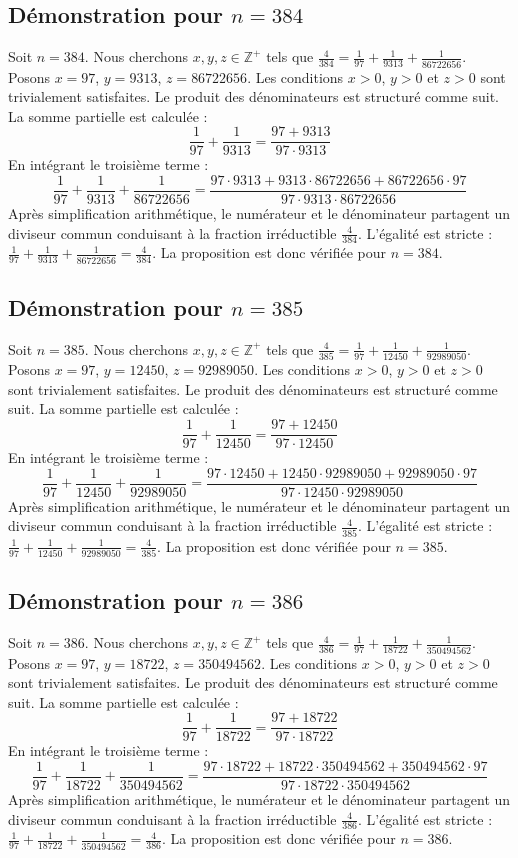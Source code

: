 \documentclass[11pt,a4paper]{article}
\begin{document}
\subsection{Démonstration pour $n = 384$}
Soit $n = 384$. Nous cherchons $x, y, z \in \mathbb{Z}^{+}$ tels que $\frac{4}{384} = \frac{1}{97} + \frac{1}{9313} + \frac{1}{86722656}$.
Posons $x = 97$, $y = 9313$, $z = 86722656$.
Les conditions $x > 0$, $y > 0$ et $z > 0$ sont trivialement satisfaites.
Le produit des dénominateurs est structuré comme suit. La somme partielle est calculée :
$$ \frac{1}{97} + \frac{1}{9313} = \frac{97+9313}{97 \cdot 9313} $$
En intégrant le troisième terme :
$$ \frac{1}{97} + \frac{1}{9313} + \frac{1}{86722656} = \frac{97 \cdot 9313 + 9313 \cdot 86722656 + 86722656 \cdot 97}{97 \cdot 9313 \cdot 86722656} $$
Après simplification arithmétique, le numérateur et le dénominateur partagent un diviseur commun conduisant à la fraction irréductible $\frac{4}{384}$.
L'égalité est stricte : $\frac{1}{97} + \frac{1}{9313} + \frac{1}{86722656} = \frac{4}{384}$.
La proposition est donc vérifiée pour $n = 384$.
\subsection{Démonstration pour $n = 385$}
Soit $n = 385$. Nous cherchons $x, y, z \in \mathbb{Z}^{+}$ tels que $\frac{4}{385} = \frac{1}{97} + \frac{1}{12450} + \frac{1}{92989050}$.
Posons $x = 97$, $y = 12450$, $z = 92989050$.
Les conditions $x > 0$, $y > 0$ et $z > 0$ sont trivialement satisfaites.
Le produit des dénominateurs est structuré comme suit. La somme partielle est calculée :
$$ \frac{1}{97} + \frac{1}{12450} = \frac{97+12450}{97 \cdot 12450} $$
En intégrant le troisième terme :
$$ \frac{1}{97} + \frac{1}{12450} + \frac{1}{92989050} = \frac{97 \cdot 12450 + 12450 \cdot 92989050 + 92989050 \cdot 97}{97 \cdot 12450 \cdot 92989050} $$
Après simplification arithmétique, le numérateur et le dénominateur partagent un diviseur commun conduisant à la fraction irréductible $\frac{4}{385}$.
L'égalité est stricte : $\frac{1}{97} + \frac{1}{12450} + \frac{1}{92989050} = \frac{4}{385}$.
La proposition est donc vérifiée pour $n = 385$.
\subsection{Démonstration pour $n = 386$}
Soit $n = 386$. Nous cherchons $x, y, z \in \mathbb{Z}^{+}$ tels que $\frac{4}{386} = \frac{1}{97} + \frac{1}{18722} + \frac{1}{350494562}$.
Posons $x = 97$, $y = 18722$, $z = 350494562$.
Les conditions $x > 0$, $y > 0$ et $z > 0$ sont trivialement satisfaites.
Le produit des dénominateurs est structuré comme suit. La somme partielle est calculée :
$$ \frac{1}{97} + \frac{1}{18722} = \frac{97+18722}{97 \cdot 18722} $$
En intégrant le troisième terme :
$$ \frac{1}{97} + \frac{1}{18722} + \frac{1}{350494562} = \frac{97 \cdot 18722 + 18722 \cdot 350494562 + 350494562 \cdot 97}{97 \cdot 18722 \cdot 350494562} $$
Après simplification arithmétique, le numérateur et le dénominateur partagent un diviseur commun conduisant à la fraction irréductible $\frac{4}{386}$.
L'égalité est stricte : $\frac{1}{97} + \frac{1}{18722} + \frac{1}{350494562} = \frac{4}{386}$.
La proposition est donc vérifiée pour $n = 386$.
\end{document}
